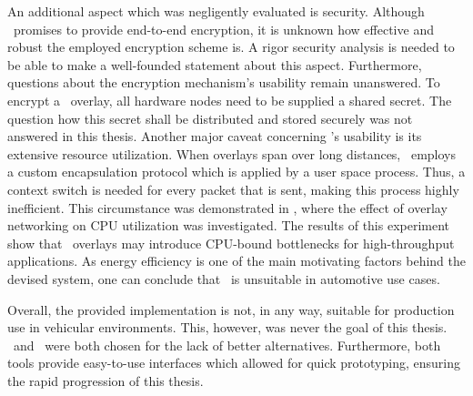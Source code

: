 An additional aspect which was negligently evaluated is security. Although \linebreak\wnet\ promises to provide end-to-end encryption, it is unknown how effective and robust the employed encryption scheme is. A rigor security analysis is needed to be able to make a well-founded statement about this aspect. Furthermore, questions about the encryption mechanism's usability remain unanswered. To encrypt a \weave\ overlay, all hardware nodes need to be supplied a shared secret. The question how this secret shall be distributed and stored securely was not answered in this thesis.
Another major caveat concerning \weave 's usability is its extensive resource utilization.  When overlays span over long distances, \weave\ employs a custom encapsulation protocol which is applied by a user space process. Thus, a context switch is needed for every packet that is sent, making this process highly inefficient. This circumstance was demonstrated in , where the effect of overlay networking on CPU utilization was investigated. The results of this experiment show that \weave\ overlays may introduce CPU-bound bottlenecks for high-throughput applications. As energy efficiency is one of the main motivating factors behind the devised system, one can conclude that \wnet\ is unsuitable in automotive use cases.

Overall, the provided implementation is not, in any way, suitable for production use in vehicular environments. This, however, was never the goal of this thesis. \wnet\ and \docker\ were both chosen for the lack of better alternatives. Furthermore, both tools provide easy-to-use interfaces which allowed for quick prototyping, ensuring the rapid progression of this thesis.

